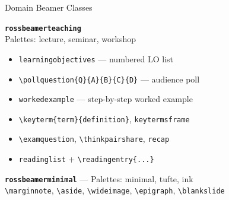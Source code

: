 \documentclass[palette=lancet]{rossbeamerscientific}
\newcommand{\cmd}[1]{\texttt{\color{rbAccent}\textbackslash #1}}
\newcommand{\env}[1]{\texttt{\color{rbSecondary}#1}}
\newcommand{\cls}[1]{\texttt{\color{rbPrimary}\bfseries #1}}
\begin{document}
\begin{frame}{Domain Beamer Classes}
\begin{twocol}[0.47]
  \textbf{\cls{rossbeamerteaching}}\\
  Palettes: lecture, seminar, workshop
  \begin{itemize}\setlength\itemsep{0pt}
    \item \env{learningobjectives} --- numbered LO list
    \item \cmd{pollquestion\{Q\}\{A\}\{B\}\{C\}\{D\}} --- audience poll
    \item \env{workedexample} --- step-by-step worked example
    \item \cmd{keyterm\{term\}\{definition\}}, \env{keytermsframe}
    \item \cmd{examquestion}, \cmd{thinkpairshare}, \env{recap}
    \item \env{readinglist} + \cmd{readingentry\{...\}}
  \end{itemize}
  \vskip4pt

  \textbf{\cls{rossbeamerminimal}} --- Palettes: minimal, tufte, ink\\
  {\footnotesize \cmd{marginnote}, \cmd{aside}, \cmd{wideimage}, \cmd{epigraph}, \cmd{blankslide}}
\end{twocol}
\end{frame}
\end{document}
